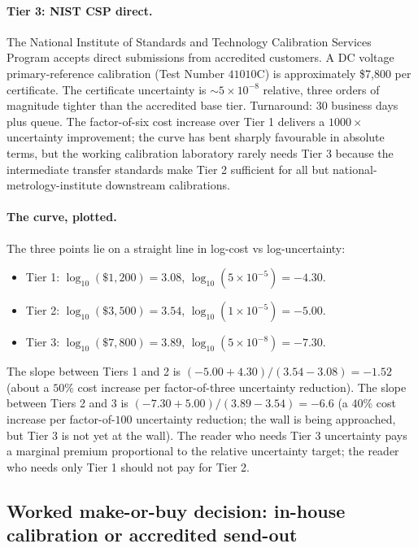 \paragraph{Tier 3: NIST CSP direct.} The National Institute of
Standards and Technology Calibration Services Program
\cite{web:ch04t3b-nist-csp-fees} accepts direct submissions
from accredited customers. A DC voltage primary-reference
calibration (Test Number $41010$C) is approximately \$7,800
per certificate. The certificate uncertainty is $\sim 5 \times
10^{-8}$ relative, three orders of magnitude tighter than the
accredited base tier. Turnaround: $30$ business days plus
queue. The factor-of-six cost increase over Tier 1 delivers a
$1000\times$ uncertainty improvement; the curve has bent
sharply favourable in absolute terms, but the working
calibration laboratory rarely needs Tier 3 because the
intermediate transfer standards make Tier 2 sufficient for
all but national-metrology-institute downstream calibrations.

\paragraph{The curve, plotted.} The three points lie on a
straight line in log-cost vs log-uncertainty:
\begin{itemize}[leftmargin=*]
\item Tier 1: $\log_{10}(\$1{,}200) = 3.08$, $\log_{10}(5 \times
10^{-5}) = -4.30$.
\item Tier 2: $\log_{10}(\$3{,}500) = 3.54$, $\log_{10}(1 \times
10^{-5}) = -5.00$.
\item Tier 3: $\log_{10}(\$7{,}800) = 3.89$, $\log_{10}(5 \times
10^{-8}) = -7.30$.
\end{itemize}
The slope between Tiers 1 and 2 is
$(-5.00 + 4.30)/(3.54 - 3.08) = -1.52$ (about a $50\%$ cost
increase per factor-of-three uncertainty reduction). The slope
between Tiers 2 and 3 is
$(-7.30 + 5.00)/(3.89 - 3.54) = -6.6$ (a $40\%$ cost increase
per factor-of-$100$ uncertainty reduction; the wall is being
approached, but Tier 3 is not yet at the wall). The reader
who needs Tier 3 uncertainty pays a marginal premium
proportional to the relative uncertainty target; the reader
who needs only Tier 1 should not pay for Tier 2.

\subsection{Worked make-or-buy decision: in-house calibration
or accredited send-out}

